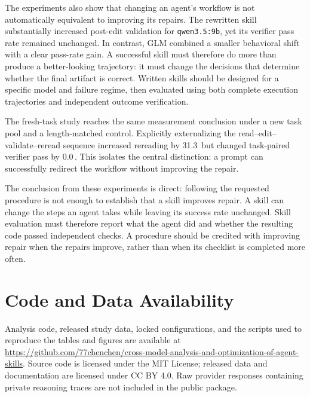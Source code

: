 \documentclass[10pt]{article}
\newcommand{\pp}{\,\text{pp}}
\newcommand{\QwenWeak}{\texttt{qwen3.5:\allowbreak 9b}}
\begin{document}
The experiments also show that changing an agent's workflow is not automatically equivalent to improving its repairs. The rewritten skill substantially increased post-edit validation for \QwenWeak{}, yet its verifier pass rate remained unchanged. In contrast, GLM combined a smaller behavioral shift with a clear pass-rate gain. A successful skill must therefore do more than produce a better-looking trajectory: it must change the decisions that determine whether the final artifact is correct. Written skills should be designed for a specific model and failure regime, then evaluated using both complete execution trajectories and independent outcome verification.

The fresh-task study reaches the same measurement conclusion under a new task pool and a length-matched control. Explicitly externalizing the read--edit--validate--reread sequence increased rereading by 31.3\pp{} but changed task-paired verifier pass by 0.0\pp{}. This isolates the central distinction: a prompt can successfully redirect the workflow without improving the repair.

The conclusion from these experiments is direct: following the requested procedure is not enough to establish that a skill improves repair. A skill can change the steps an agent takes while leaving its success rate unchanged. Skill evaluation must therefore report what the agent did and whether the resulting code passed independent checks. A procedure should be credited with improving repair when the repairs improve, rather than when its checklist is completed more often.



\section*{Code and Data Availability}
Analysis code, released study data, locked configurations, and the scripts used to reproduce the tables and figures are available at \url{https://github.com/77chenchen/cross-model-analysis-and-optimization-of-agent-skills}. Source code is licensed under the MIT License; released data and documentation are licensed under CC BY 4.0. Raw provider responses containing private reasoning traces are not included in the public package.



\end{document}
